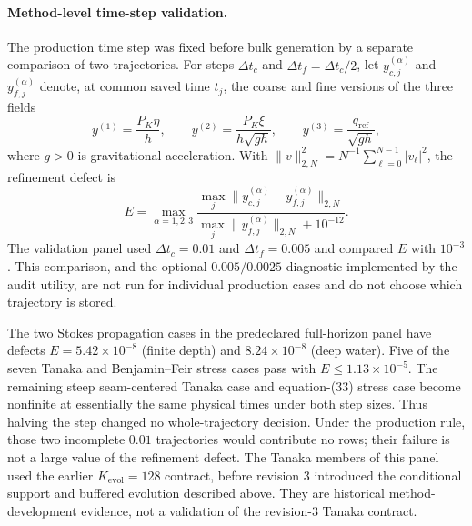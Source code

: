 \paragraph{Method-level time-step validation.}
The production time step was fixed before bulk generation by a separate
comparison of two trajectories.  For steps $\Delta t_c$ and
$\Delta t_f=\Delta t_c/2$, let $y_{c,j}^{(\alpha)}$ and
$y_{f,j}^{(\alpha)}$ denote, at common saved time $t_j$, the coarse and fine
versions of the three fields
\begin{equation}
  y^{(1)}=\frac{P_K\eta}{h},
  \qquad
  y^{(2)}=\frac{P_K\xi}{h\sqrt{gh}},
  \qquad
  y^{(3)}=\frac{q_{\mathrm{ref}}}{\sqrt{gh}},
  \label{eq:paper-refinement-fields}
\end{equation}
where $g>0$ is gravitational acceleration.  With
$\lVert v\rVert_{2,N}^2=N^{-1}\sum_{\ell=0}^{N-1}|v_\ell|^2$, the refinement
defect is
\begin{equation}
  E
  =
  \max_{\alpha=1,2,3}
  \frac{\max_j
    \lVert y_{c,j}^{(\alpha)}-y_{f,j}^{(\alpha)}\rVert_{2,N}}
       {\max_j\lVert y_{f,j}^{(\alpha)}\rVert_{2,N}+10^{-12}}.
  \label{eq:paper-refinement-defect}
\end{equation}
The validation panel used $\Delta t_c=0.01$ and
$\Delta t_f=0.005$ and compared \(E\) with \(10^{-3}\).  This comparison,
and the optional \(0.005/0.0025\) diagnostic implemented by the audit utility,
are not run for individual production cases and do not choose which
trajectory is stored.

The two Stokes propagation cases in the predeclared full-horizon panel have
defects $E=5.42\times10^{-8}$ (finite depth) and
$8.24\times10^{-8}$ (deep water).  Five of the seven Tanaka and
Benjamin--Feir stress cases pass with $E\leq1.13\times10^{-5}$.  The remaining
steep seam-centered Tanaka case and equation-(33) stress case become
nonfinite at essentially the same physical times under both step sizes.
Thus halving the step changed no whole-trajectory decision.  Under the
production rule, those two incomplete \(0.01\) trajectories would contribute
no rows; their failure is not a large value of the refinement defect.  The
Tanaka members of this panel used the earlier $K_{\mathrm{evol}}=128$
contract, before revision 3 introduced the conditional support and buffered
evolution described above.  They are historical method-development evidence,
not a validation of the revision-3 Tanaka contract.

